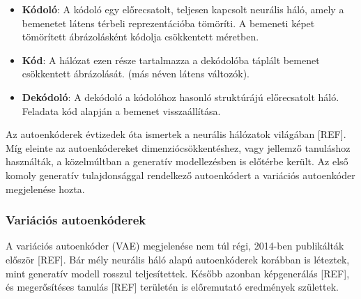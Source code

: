 \begin{itemize}
	\item \textbf{Kódoló}: A kódoló egy előrecsatolt, teljesen kapcsolt neurális háló, amely a bemenetet látens térbeli reprezentációba tömöríti. A bemeneti képet tömörített ábrázolásként kódolja csökkentett méretben.
	\item \textbf{Kód}: A hálózat ezen része tartalmazza a dekódolóba táplált bemenet csökkentett ábrázolását. (más néven látens változók).
	\item \textbf{Dekódoló}: A dekódoló a kódolóhoz hasonló struktúrájú előrecsatolt háló. Feladata kód alapján a bemenet visszaállítása.
\end{itemize}

Az autoenkóderek évtizedek óta ismertek a neurális hálózatok világában [REF]. Míg eleinte az autoenkódereket dimenziócsökkentéshez, vagy jellemző tanuláshoz használták, a közelmúltban a generatív modellezésben is előtérbe került. Az első komoly generatív tulajdonsággal rendelkező autoenkódert a variációs autoenkóder megjelenése hozta.



\subsubsection{Variációs autoenkóderek}

A variációs autoenkóder (VAE) megjelenése nem túl régi, 2014-ben publikálták először [REF]. Bár mély neurális háló alapú autoenkóderek korábban is léteztek, mint generatív modell rosszul teljesítettek. Később azonban képgenerálás [REF], és megerősítéses tanulás [REF] területén is előremutató eredmények születtek.


